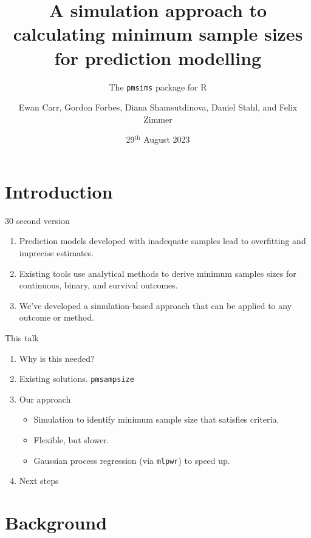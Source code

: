 \documentclass[11pt]{beamer}
\title[The \texttt{pmsims} package for R]{
    A simulation approach to calculating minimum sample sizes for prediction modelling
}
\subtitle{The \texttt{pmsims} package for R}
\date{29$^{\text{th}}$ August 2023}
\author[Biostatistics \& Health Informatics, KCL]{%
    Ewan Carr, Gordon Forbes, Diana Shamsutdinova, Daniel Stahl, 
    and Felix Zimmer}
\institute[]{Department of Biostatistics \& Health Informatics\\ King's College London}
\begin{document}
\maketitle

\section{Introduction}

\begin{frame}{30 second version}
    \Large
    \begin{enumerate}
        \setlength{\itemsep}{12pt}

        \item Prediction models developed with inadequate samples lead to
            \alert{overfitting} and \alert{imprecise} estimates.

        \item Existing tools use \alert{analytical methods} to derive minimum
                samples sizes for continuous, binary, and survival outcomes. 

            \item We've developed a \alert{simulation-based} approach that can
                be applied to \alert{any} outcome or method.
        \end{enumerate}
\end{frame}

\begin{frame}[t]{This talk}
    \begin{enumerate}
        \item Why is this needed?
        \item Existing solutions. \texttt{pmsampsize}
        \item Our approach
            \begin{itemize}
                \item Simulation to identify minimum sample size that satisfies criteria.
                \item Flexible, but slower.
                \item Gaussian process regression (via \texttt{mlpwr}) to speed up.
            \end{itemize}
        \item Next steps
    \end{enumerate}
\end{frame}

\section{Background}
\end{document}
